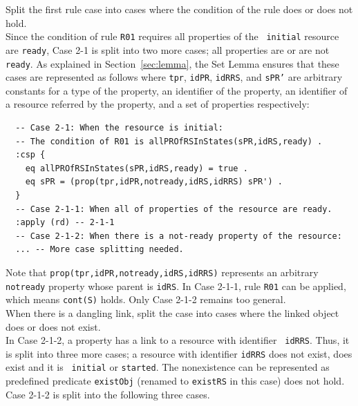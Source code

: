 \documentclass[12pt]{report}
\newcommand{\stt}[1]{{\small{\tt {#1}}}}
\begin{document}
 Split the first rule case into cases where
the condition of the rule does or does not hold. \\ Since the
condition of rule {\tt R01} requires all properties of the {\tt
  initial} resource are {\tt ready}, Case 2-1 is split into two more
cases; all properties are or are not {\tt ready}. As explained in
Section~\ref{sec:lemma}, the Set Lemma ensures that these cases are
represented as follows where {\tt tpr}, {\tt idPR}, {\tt idRRS}, and
{\tt sPR'} are arbitrary constants for a type of the property, an
identifier of the property, an identifier of a resource referred by
the property, and a set of properties respectively:
\begin{verbatim}
  -- Case 2-1: When the resource is initial:
  -- The condition of R01 is allPROfRSInStates(sPR,idRS,ready) .
  :csp { 
    eq allPROfRSInStates(sPR,idRS,ready) = true .
    eq sPR = (prop(tpr,idPR,notready,idRS,idRRS) sPR') .
  }
  -- Case 2-1-1: When all of properties of the resource are ready.
  :apply (rd) -- 2-1-1
  -- Case 2-1-2: When there is a not-ready property of the resource:
  ... -- More case splitting needed.
\end{verbatim}
Note that \stt{prop(tpr,idPR,notready,idRS,idRRS)} represents an
arbitrary {\tt notready} property whose parent is {\tt idRS}. In Case
2-1-1, rule {\tt R01} can be applied, which means \stt{cont(S)} holds. Only
Case 2-1-2 remains too general.\\

 When there is a dangling link, split the case
into cases where the linked object does or does not exist. \\ In Case
2-1-2, a property has a link to a resource with identifier {\tt
  idRRS}. Thus, it is split into three more cases; a resource with
identifier {\tt idRRS} does not exist, does exist and it is {\tt
  initial} or {\tt started}. The nonexistence can be represented as
predefined predicate {\tt existObj} (renamed to {\tt existRS} in this
case) does not hold. Case 2-1-2 is split into the following three
cases.
\end{document}
